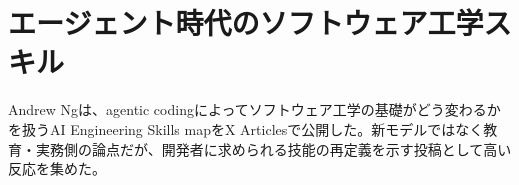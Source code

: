\section{エージェント時代のソフトウェア工学スキル}
Andrew Ngは、agentic codingによってソフトウェア工学の基礎がどう変わるかを扱うAI Engineering Skills mapをX Articlesで公開した。新モデルではなく教育・実務側の論点だが、開発者に求められる技能の再定義を示す投稿として高い反応を集めた。
